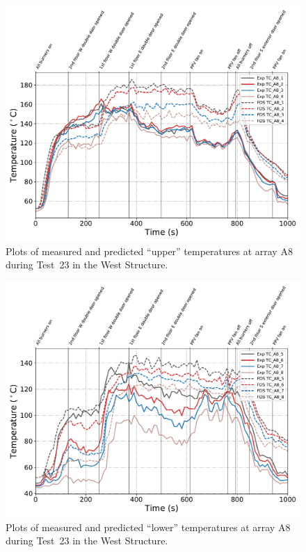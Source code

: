 \begin{figure}[!h]
	\centering
	\includegraphics[width=\columnwidth]{Figures/Plots/Validation/Temperature/Test_23_TC_A8_upper}
	\caption{Plots of measured and predicted ``upper'' temperatures at array A8 during Test~23 in the West Structure.}
	\label{fig:TCA8_upper_data_Test23}
\end{figure}
\begin{figure}[!h]
	\centering
	\includegraphics[width=\columnwidth]{Figures/Plots/Validation/Temperature/Test_23_TC_A8_lower}
	\caption{Plots of measured and predicted ``lower'' temperatures at array A8 during Test~23 in the West Structure.}
	\label{fig:TCA8_lower_data_Test23}
\end{figure}

